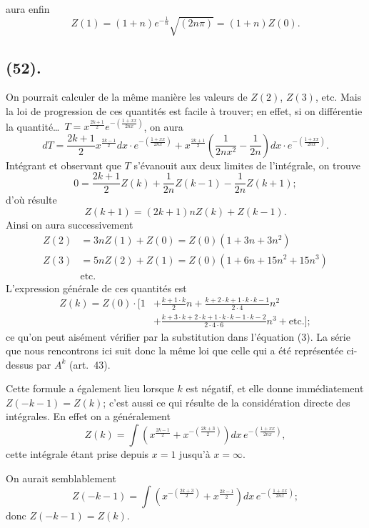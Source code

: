 \documentclass{article}
\begin{document}
aura enfin
\[ Z(1)=(1+n)e^{-\frac{1}{n}}\sqrt{(2n\pi)}=(1+n)Z(0). \tag{2} \]

\subsection*{(52).}

On pourrait calculer de la même manière les valeurs de $Z(2)$, $Z(3)$, etc. Mais la loi de progression de ces quantités est facile à trouver; en effet, si on différentie la quantité\ldots\ $T=x^{\frac{2k+1}{2}}e^{-\left(\frac{1+xx}{2nx}\right)}$, on aura
\[ dT=\frac{2k+1}{2}x^{\frac{2k-1}{2}}dx\cdot e^{-\left(\frac{1+xx}{2nx}\right)}+x^{\frac{2k+1}{2}}\left(\frac{1}{2nx^{2}}-\frac{1}{2n}\right)dx\cdot e^{-\left(\frac{1+xx}{2nx}\right)}. \]
Intégrant et observant que $T$ s'évanouit aux deux limites de l'intégrale, on trouve
\[ 0=\frac{2k+1}{2}Z(k)+\frac{1}{2n}Z(k-1)-\frac{1}{2n}Z(k+1); \]
d'où résulte
\[ Z(k+1)=(2k+1)nZ(k)+Z(k-1). \tag{3} \]
Ainsi on aura successivement
\[ \begin{aligned} Z(2)&=3nZ(1)+Z(0)=Z(0)(1+3n+3n^{2})\\ Z(3)&=5nZ(2)+Z(1)=Z(0)(1+6n+15n^{2}+15n^{3})\\ &\text{etc.} \end{aligned} \]
L'expression générale de ces quantités est
\[ \begin{aligned} Z(k)=Z(0)\cdot\Big[1&+\frac{k+1\cdot k}{2}n+\frac{k+2\cdot k+1\cdot k\cdot k-1}{2\cdot4}n^{2}\\ &+\frac{k+3\cdot k+2\cdot k+1\cdot k\cdot k-1\cdot k-2}{2\cdot4\cdot6}n^{3}+\text{etc.}\Big]; \end{aligned} \tag{4} \]
ce qu'on peut aisément vérifier par la substitution dans l'équation (3). La série que nous rencontrons ici suit donc la même loi que celle qui a été représentée ci-dessus par $A^{k}$ (art.\ 43).

Cette formule a également lieu lorsque $k$ est négatif, et elle donne immédiatement $Z(-k-1)=Z(k)$; c'est aussi ce qui résulte de la considération directe des intégrales. En effet on a généralement
\[ Z(k)=\int\left(x^{\frac{2k-1}{2}}+x^{-\left(\frac{2k+3}{2}\right)}\right)dx\,e^{-\left(\frac{1+xx}{2nx}\right)}, \]
cette intégrale étant prise depuis $x=1$ jusqu'à $x=\infty$.


On aurait semblablement
\[ Z(-k-1)=\int\left(x^{-\left(\frac{2k+3}{2}\right)}+x^{\frac{2k-1}{2}}\right)dx\,e^{-\left(\frac{1+xx}{2nx}\right)}; \]
donc $Z(-k-1)=Z(k)$.
\end{document}
